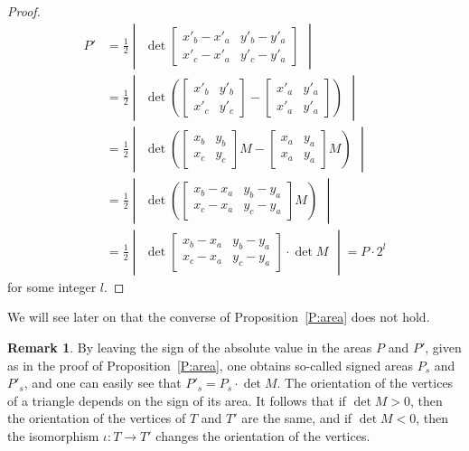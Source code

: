 \documentclass[12pt]{amsart}
\theoremstyle{plain}
\theoremstyle{definition}
\newtheorem{remark}[theorem]{Remark}
\numberwithin{equation}{section}
\begin{document}
\begin{proof}
\begin{align*}
P' &= \frac{1}{2}\begin{vmatrix} \det
 \begin{bmatrix}
 	x'_b-x'_a&y'_b-y'_a\\
 	x'_c-x'_a&y'_c-y'_a
 \end{bmatrix}\end{vmatrix} \\
 &=
\frac{1}{2}\begin{vmatrix} \det\left(
\begin{bmatrix}
	x'_b &y'_b \\
	x'_c &y'_c
\end{bmatrix}- \begin{bmatrix}
 x'_a& y'_a\\
 x'_a& y'_a
\end{bmatrix}\right)\end{vmatrix}\\
&=\frac{1}{2}\begin{vmatrix} \det\left(
\begin{bmatrix}
	x_b &y_b \\
	x_c &y_c
\end{bmatrix}M- \begin{bmatrix}
	x_a& y_a\\
	x_a& y_a
\end{bmatrix}M\right)\end{vmatrix} \\
&=
\frac{1}{2}\begin{vmatrix}\det
	\left(\begin{bmatrix}
		x_b-x_a&y_b-y_a\\
	x_c-x_a&y_c-y_a
\end{bmatrix}
	 M\right)\end{vmatrix}
\\&= \frac{1}{2}\begin{vmatrix} \det
			\begin{bmatrix}
			x_b-x_a&y_b-y_a\\
			x_c-x_a&y_c-y_a
		\end{bmatrix}
	\cdot \det M\end{vmatrix} = P\cdot 2^{l}
\end{align*}
for some integer $l$.
\end{proof}

We will see later on that the converse of Proposition~\ref{P:area} does not hold.

\begin{remark}\label{R:orient}
By leaving the sign of the absolute value in the areas $P$ and $P'$, given as in the proof of Proposition~\ref{P:area}, one obtains so-called signed areas $P_s$ and $P'_s$, and one can easily see that $P'_s = P_s \cdot \det M$. The orientation of the vertices of a triangle depends on the sign of its area. It follows that if $\det M > 0$, then the orientation of the vertices of $T$ and $T'$ are the same, and if $\det M < 0$, then the isomorphism $\iota: T \rightarrow T'$ changes the orientation of the vertices.
\end{remark}
\end{document}
